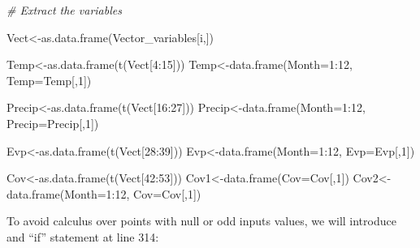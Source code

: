 \documentclass[
  10pt,
  b5paper,
]{book}
\newenvironment{Shaded}{\begin{snugshade}}{\end{snugshade}}
\newcommand{\AttributeTok}[1]{\textcolor[rgb]{0.77,0.63,0.00}{#1}}
\newcommand{\CommentTok}[1]{\textcolor[rgb]{0.56,0.35,0.01}{\textit{#1}}}
\newcommand{\DecValTok}[1]{\textcolor[rgb]{0.00,0.00,0.81}{#1}}
\newcommand{\FunctionTok}[1]{\textcolor[rgb]{0.00,0.00,0.00}{#1}}
\newcommand{\NormalTok}[1]{#1}
\newcommand{\OtherTok}[1]{\textcolor[rgb]{0.56,0.35,0.01}{#1}}
\newcommand{\SpecialCharTok}[1]{\textcolor[rgb]{0.00,0.00,0.00}{#1}}
\begin{document}
\begin{Shaded}
\begin{Highlighting}[]
\CommentTok{\# Extract the variables }
  
\NormalTok{  Vect}\OtherTok{\textless{}{-}}\FunctionTok{as.data.frame}\NormalTok{(Vector\_variables[i,])}
  
\NormalTok{  Temp}\OtherTok{\textless{}{-}}\FunctionTok{as.data.frame}\NormalTok{(}\FunctionTok{t}\NormalTok{(Vect[}\DecValTok{4}\SpecialCharTok{:}\DecValTok{15}\NormalTok{]))}
\NormalTok{  Temp}\OtherTok{\textless{}{-}}\FunctionTok{data.frame}\NormalTok{(}\AttributeTok{Month=}\DecValTok{1}\SpecialCharTok{:}\DecValTok{12}\NormalTok{, }\AttributeTok{Temp=}\NormalTok{Temp[,}\DecValTok{1}\NormalTok{])}
  
\NormalTok{  Precip}\OtherTok{\textless{}{-}}\FunctionTok{as.data.frame}\NormalTok{(}\FunctionTok{t}\NormalTok{(Vect[}\DecValTok{16}\SpecialCharTok{:}\DecValTok{27}\NormalTok{]))}
\NormalTok{  Precip}\OtherTok{\textless{}{-}}\FunctionTok{data.frame}\NormalTok{(}\AttributeTok{Month=}\DecValTok{1}\SpecialCharTok{:}\DecValTok{12}\NormalTok{, }\AttributeTok{Precip=}\NormalTok{Precip[,}\DecValTok{1}\NormalTok{])}
  
\NormalTok{  Evp}\OtherTok{\textless{}{-}}\FunctionTok{as.data.frame}\NormalTok{(}\FunctionTok{t}\NormalTok{(Vect[}\DecValTok{28}\SpecialCharTok{:}\DecValTok{39}\NormalTok{]))}
\NormalTok{  Evp}\OtherTok{\textless{}{-}}\FunctionTok{data.frame}\NormalTok{(}\AttributeTok{Month=}\DecValTok{1}\SpecialCharTok{:}\DecValTok{12}\NormalTok{, }\AttributeTok{Evp=}\NormalTok{Evp[,}\DecValTok{1}\NormalTok{])}
    
\NormalTok{  Cov}\OtherTok{\textless{}{-}}\FunctionTok{as.data.frame}\NormalTok{(}\FunctionTok{t}\NormalTok{(Vect[}\DecValTok{42}\SpecialCharTok{:}\DecValTok{53}\NormalTok{]))}
\NormalTok{  Cov1}\OtherTok{\textless{}{-}}\FunctionTok{data.frame}\NormalTok{(}\AttributeTok{Cov=}\NormalTok{Cov[,}\DecValTok{1}\NormalTok{])}
\NormalTok{  Cov2}\OtherTok{\textless{}{-}}\FunctionTok{data.frame}\NormalTok{(}\AttributeTok{Month=}\DecValTok{1}\SpecialCharTok{:}\DecValTok{12}\NormalTok{, }\AttributeTok{Cov=}\NormalTok{Cov[,}\DecValTok{1}\NormalTok{])}
\end{Highlighting}
\end{Shaded}

To avoid calculus over points with null or odd inputs values, we will introduce and ``if'' statement at line 314:
\end{document}
